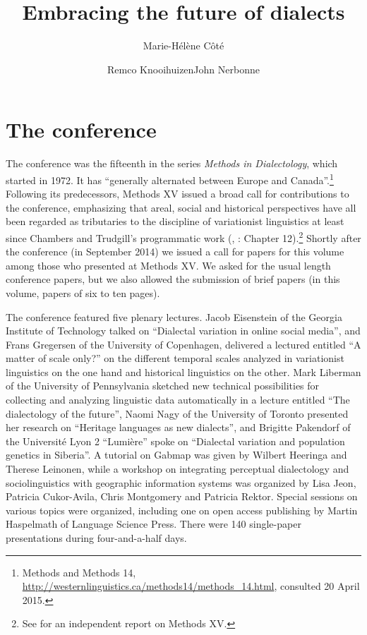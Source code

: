 \documentclass[output=paper]{LSP/langsci}
\author{Marie-Hélène Côté\affiliation{Université Laval}\and Remco Knooihuizen\affiliation{University of Groningen}\lastand John Nerbonne\affiliation{University of Groningen, University of Freiburg}}
\title{Embracing the future of dialects}
\begin{document}
% 


\section{The conference}
The conference was the fifteenth in the series \textit{Methods in Dialectology}, which started in 1972. It %
 has “generally alternated between Europe and Canada”.\footnote{Methods and Methods 14, \url{http://westernlinguistics.ca/methods14/methods_14.html}, consulted 20 April 2015.} Following its predecessors, Methods XV issued a broad call for contributions to the conference, emphasizing that areal, social and historical perspectives have all been regarded as tributaries to the discipline of variationist linguistics at least since Chambers and Trudgill’s programmatic work (\citealt{chambers_dialectology_1980}, \citealt{chambers_dialectology_1998}: Chapter 12).\footnote{See \citet{klein_2014} for an independent report on Methods XV.} Shortly after the conference (in September 2014) we issued a call for papers for this volume among those who presented at Methods XV. We asked for the usual length conference papers, but we also allowed the submission of brief papers (in this volume, papers of six to ten pages).

The conference featured five plenary lectures. Jacob Eisenstein of the Georgia Institute of Technology talked on “Dialectal variation in online social media”, and Frans Gregersen of  the University of Copenhagen, delivered a lectured entitled “A matter of scale only?” on the different temporal scales analyzed in variationist linguistics on the one hand and historical linguistics on the other. Mark Liberman of the University of Pennsylvania sketched new technical possibilities for collecting and analyzing linguistic data automatically in a lecture entitled “The dialectology of the future”, Naomi Nagy of the University of Toronto presented her research on “Heritage languages as new dialects”, and Brigitte Pakendorf of the Université Lyon 2 “Lumière” spoke on “Dialectal variation and population genetics in Siberia”.  A tutorial on Gabmap \citep{nerbonne_gabmap_2011} was given by Wilbert Heeringa and Therese Leinonen, while a workshop on integrating perceptual dialectology and sociolinguistics with geographic information systems was organized by Lisa Jeon, Patricia Cukor-Avila, Chris Montgomery and Patricia Rektor. Special sessions on various topics were organized, including one on open access publishing by Martin Haspelmath of Language Science Press.  There were 140 single-paper presentations during four-and-a-half days.
\end{document}
